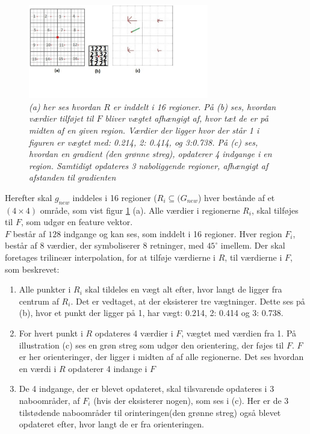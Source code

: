 \begin{figure}[H]
    \centering
    \includegraphics[width=0.70\textwidth]{fig/tilsift.jpg}
     \vspace{-1em}
    \begin{center}    
       \caption{{\footnotesize \textit{(a) her ses hvordan $R$ er inddelt i 16 regioner. På (b) ses, hvordan værdier tilføjet til $F$ bliver vægtet afhængigt af, hvor tæt de er på midten af en given region. Værdier der ligger hvor der står 1 i figuren er vægtet med: 0.214, 2: 0.414, og 3:0.738. På (c) ses, hvordan en gradient (den grønne streg), opdaterer 4 indgange i en region. Samtidigt opdateres 3 naboliggende regioner, afhængigt af afstanden til gradienten}}}
    \label{trilinear}
     \end{center}
     \vspace{-2.5em}
  \end{figure} \noindent
Herefter skal $g_{new}$ inddeles i 16 regioner ($R_{i} \subseteq (G_{new}$) hver bestånde af et $(4\times 4)$ område, som vist figur \ref{trilinear} (a). Alle værdier i regionerne $R_i$, skal tilføjes til $F$, som udgør en feature vektor.
\\
$F$ består af $128$ indgange og kan ses, som inddelt i 16 regioner. Hver region $F_i$, består af 8 værdier, der symboliserer 8 retninger, med $45^\circ$ imellem. Der skal foretages trilineær interpolation, for at tilføje værdierne i $R$, til værdierne i $F$, som beskrevet:
\begin{enumerate}
\item{Alle punkter i $R_{i}$ skal tildeles en vægt alt efter, hvor langt de ligger fra centrum af $R_{i}$. Det er vedtaget, at der eksisterer tre vægtninger. Dette ses på (b), hvor et punkt der ligger på  1, har vægt: 0.214, 2: 0.414 og 3: 0.738.}
\item{For hvert punkt i $R$ opdateres 4 værdier i $F$, vægtet med værdien fra 1. På illustration (c) ses en grøn streg som udgør den orientering, der føjes til $F$. $F$ er her orienteringer, der ligger i midten af af alle regionerne. Det ses hvordan en værdi i $R$ opdaterer 4 indange i $F$}
\item{De 4 indgange, der er blevet opdateret, skal tilsvarende opdateres i 3 naboområder, af $F_i$ (hvis der eksisterer nogen), som ses i (c). Her er de 3 tilstødende naboområder til orinteringen(den grønne streg) også blevet opdateret efter, hvor langt de er fra orienteringen.}
\end{enumerate}

